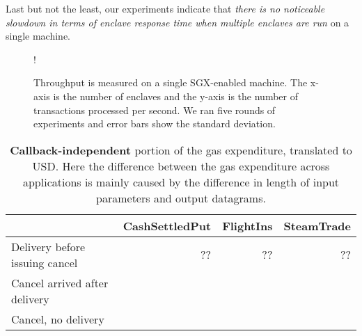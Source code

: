 Last but not the least, our experiments indicate
that {\it there is no noticeable slowdown in terms of enclave
response time when multiple enclaves are run} on a single machine.

\begin{figure}[h]
  \resizebox {\columnwidth} {!}{
}
\caption{Throughput is measured on a single SGX-enabled machine. The x-axis is
the number of enclaves and the y-axis is the number of transactions processed per
second.  We ran five rounds of experiments and error bars show the standard
deviation.}
\label{fig:trpt}
\end{figure}


\begin{table*}[ht]
\centering
\begin{tabular}{lr|r|r}
\toprule
& \multicolumn{1}{c|}{\sf CashSettledPut} &
  \multicolumn{1}{c|}{\sf FlightIns} &
  \multicolumn{1}{c}{\sf SteamTrade} \\
\midrule
Delivery before issuing cancel & ?? & ?? & ?? \\ 
Cancel arrived after delivery & & & \\ 
Cancel, no delivery & & & \\ 
\bottomrule
\end{tabular}
\caption{{\bf Callback-independent} portion of the gas expenditure, translated
to USD.  Here the difference between the gas expenditure across applications
is mainly caused 
by the difference in length of input parameters and output datagrams.
}
\label{tab:eval_gas}
\end{table*}



